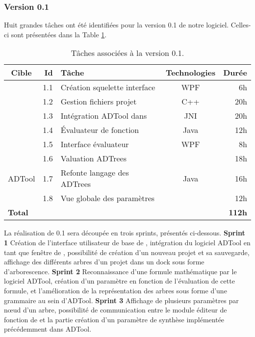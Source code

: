 	\subsubsection{Version 0.1}
		Huit grandes tâches ont été identifiées pour la version 0.1 de notre logiciel. Celles-ci sont présentées dans la {\sc Table} \ref{tab:taches_units_1}. 
		\begin{table}[H]
			\centering
			\begin{tabular}{|c|r|l|c|r|}
				\hline
				\textbf{Cible} & \textbf{Id} & \textbf{Tâche} & \textbf{Technologies} & \textbf{Durée}\\
				\hline

				\multirow{5}{*}{\glasir{}} & 1.1 & Création squelette interface & WPF & 6h\\
				\cline{2-5}
				 & 1.2 & Gestion fichiers projet & C++ & 20h\\
				\cline{2-5}
				 & 1.3 & Intégration ADTool dans \glasir & JNI & 20h\\
				\cline{2-5}
				 & 1.4 & \'Evaluateur de fonction & Java & 12h\\
				\cline{2-5}
				 & 1.5 & Interface évaluateur & WPF & 8h\\
				\hline

				\multirow{3}{*}{ADTool} & 1.6 & Valuation ADTrees & \multirow{3}{*}{Java} & 18h\\
				\cline{2-3} \cline{5-5}
				 & 1.7 & Refonte langage des ADTrees & & 16h\\
				\cline{2-3} \cline{5-5}
				 & 1.8 & Vue globale des paramètres & & 12h\\
				\hline

				\multicolumn{4}{|l|}{\bf Total} & {\bf 112h}\\
				\hline
			\end{tabular}
			\caption{Tâches associées à la version 0.1.}
			\label{tab:taches_units_1}
		\end{table}
		
		
		La réalisation de \glasir{} 0.1 sera découpée en trois sprints, présentés ci-dessous.\newline
		\textbf{Sprint 1} Création de l'interface utilisateur de base de \glasir{}, intégration du logiciel ADTool en tant que fenêtre de \glasir{}, possibilité de création d'un nouveau projet et sa sauvegarde, affichage des différents arbres d'un projet dans un dock sous forme d'arborescence.\newline
		\textbf{Sprint 2} Reconnaissance d'une formule mathématique par le logiciel ADTool, création d'un paramètre en fonction de l'évaluation de cette formule, et l'amélioration de la représentation des arbres sous forme d'une grammaire au sein d'ADTool.\newline
		\textbf{Sprint 3} Affichage de plusieurs paramètres par nœud d'un arbre, possibilité de communication entre le module éditeur de fonction de \glasir{} et la partie création d'un paramètre de synthèse implémentée précédemment dans ADTool.\newline


